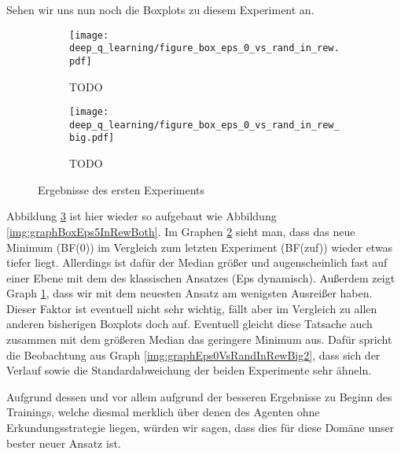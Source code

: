 Sehen wir uns nun noch die Boxplots zu diesem Experiment an.
\begin{figure}[h!]
    \centering
    \begin{subfigure}[b]{0.7\textwidth}
        \texttt{[image: deep\_q\_learning/figure\_box\_eps\_0\_vs\_rand\_in\_rew.pdf]}
        \caption{TODO}
        \label{img:graphBoxEps0VsRandInRew}
    \end{subfigure}
    \begin{subfigure}[b]{0.7\textwidth}
        \texttt{[image: deep\_q\_learning/figure\_box\_eps\_0\_vs\_rand\_in\_rew\_big.pdf]}
        \caption{TODO}
        \label{img:graphBoxEps0VsRandInRewBig}
    \end{subfigure}
    \caption{Ergebnisse des ersten Experiments}
    \label{img:graphBoxEps0VsRandInRewBoth}
\end{figure}
Abbildung \ref{img:graphBoxEps0VsRandInRewBoth} ist hier wieder so aufgebaut wie Abbildung \ref{img:graphBoxEps5InRewBoth}. Im Graphen \ref{img:graphBoxEps0VsRandInRewBig} sieht man, dass das neue Minimum (BF(0)) im Vergleich zum letzten Experiment (BF(zuf)) wieder etwas tiefer liegt. Allerdings ist dafür der Median größer und augenscheinlich fast auf einer Ebene mit dem des klassischen Ansatzes (Eps dynamisch). Außerdem zeigt Graph \ref{img:graphBoxEps0VsRandInRew}, dass wir mit dem neuesten Ansatz am wenigsten Ausreißer haben. Dieser Faktor ist eventuell nicht sehr wichtig, fällt aber im Vergleich zu allen anderen bisherigen Boxplots doch auf. Eventuell gleicht diese Tatsache auch zusammen mit dem größeren Median das geringere Minimum aus. Dafür spricht die Beobachtung aus Graph \ref{img:graphEps0VsRandInRewBig2}, dass sich der Verlauf sowie die Standardabweichung der beiden Experimente sehr ähneln.

Aufgrund dessen und vor allem aufgrund der besseren Ergebnisse zu Beginn des Trainings, welche diesmal merklich über denen des Agenten ohne Erkundungsstrategie liegen, würden wir sagen, dass dies für diese Domäne unser bester neuer Ansatz ist.